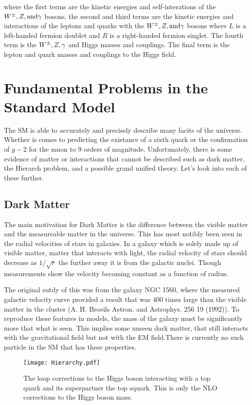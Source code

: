where the first terms are the kinetic energies and self-interations of the $W^\pm,Z, \text{and} \gamma$ bosons, the second and third terms are the kinetic energies and interactions of the leptons and quarks with the $W^\pm,Z, \text{and} \gamma$ bosons where $L$ is a left-handed fermion doublet and $R$ is a right-handed fermion singlet. The fourth term is the $W^\pm,Z,\gamma$ and Higgs masses and couplings. The final term is the lepton and quark masses and couplings to the Higgs field.  

\section{Fundamental Problems in the Standard Model}
\label{sec:SMIssues}

The SM is able to accurately and precisely describe many facits of the universe. Whether is comes to predicting the existance of a sixth quark or the confirmation of $g - 2$ for the muon to 9 orders of magnitude. Unfortunately, there is some evidence of matter or interactions that cannot be described such as dark matter, the Hierarch problem, and a possible grand unified theory. Let's look into each of these further.

\subsection{Dark Matter}
The main motivation for Dark Matter is the difference between the visible matter and the measureable matter in the universe. This has most notibly been seen in the radial velocities of stars in galaxies. In a galaxy which is solely made up of visible matter, matter that interacts with light, the radial velocity of stars should decrease as $1/\sqrt{r}$ the further away it is from the galactic nuclei. Though measurements show the velocity becoming constant as a function of radius.

The original sutdy of this was from the galaxy NGC 1560, where the measured galactic velocity curve provided a result that was 400 times large than the visible matter in the cluster (A. H. Broeils Astron. and Astrophys. 256 19 (1992)).  To reproduce these features in models, the mass of the galaxy must be significantly more that what is seen. This implies some unseen dark matter, that still interacts with the gravitational field but not with the EM field.There is currently no such particle in the SM that has these properties.

\begin{figure}
 	\centering
	\texttt{[image: Hierarchy.pdf]}
 	\caption{The loop corrections to the Higgs boson interacting with a top quark and its superpartner the top squark. This is only the NLO corrections to the Higgs boson mass.}
 	\label{HiggsMass} 
\end{figure}

